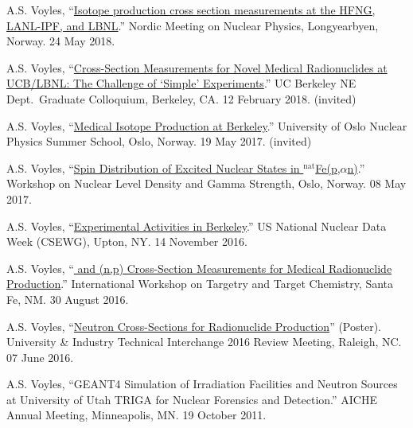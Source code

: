 \begin{bibsection}
\item A.S. Voyles, \enquote{\href{https://indico.cern.ch/event/686407/contributions/2943775/}{Isotope production cross section measurements at the HFNG, LANL-IPF, and LBNL}.}    Nordic Meeting on Nuclear Physics, Longyearbyen, Norway. 24 May 2018.

\item A.S. Voyles, \enquote{\href{https://github.com/avoyles/presentations/blob/master/2018-02-12-UCBNE_colloquium/Voyles_12_Feb_2018_NE_Colloquium_Talk.pdf}{Cross-Section Measurements for Novel Medical Radionuclides at UCB/LBNL: The Challenge of \enquote{Simple} Experiments}.} UC Berkeley NE Dept.\ Graduate Colloquium, Berkeley, CA. 12 February 2018. (invited)

\item A.S. Voyles, \enquote{\href{https://github.com/avoyles/presentations/blob/master/2017-05-19-oslo_summer_school/Voyles_19_May_2017_Oslo_Summer_School.pdf}{Medical Isotope Production at Berkeley}.} University of Oslo Nuclear Physics Summer School, Oslo, Norway.  19 May 2017. (invited)

\item A.S. Voyles, \enquote{\href{http://tid.uio.no/workshop2017/talks/OsloWS17_Voyles.pdf}{Spin Distribution of Excited Nuclear States in $^{\text{nat}}$Fe(p,$\alpha$n)}.}  Workshop on Nuclear Level Density and Gamma Strength, Oslo, Norway. 08 May 2017.


\item A.S. Voyles, \enquote{\href{https://indico.bnl.gov/event/1743/contributions/3189/}{Experimental Activities in Berkeley}.} US National Nuclear Data Week  (CSEWG), Upton, NY. 14 November 2016.


\item A.S. Voyles, \enquote{\href{https://slideslive.com/38898186/64cu-and-47scnp-crosssection-measurements-for-medical-radionuclide-production}{ and  (n,p) Cross-Section Measurements for Medical Radionuclide Production}.}  International Workshop on Targetry and Target Chemistry, Santa Fe, NM. 30 August 2016.

\item A.S. Voyles, \enquote{\href{https://github.com/avoyles/posters/blob/master/2016-06-07-UITI/Voyles_UITI2016_Poster_OsloUpdate.pdf}{Neutron Cross-Sections for Radionuclide Production}} (Poster).  University \& Industry Technical Interchange 2016 Review Meeting, Raleigh, NC. 07 June 2016.

\item A.S. Voyles, \enquote{GEANT4 Simulation of Irradiation Facilities and Neutron Sources at University of Utah TRIGA for
Nuclear Forensics and Detection.}  AICHE Annual Meeting, Minneapolis, MN. 19 October 2011.


\end{bibsection}

